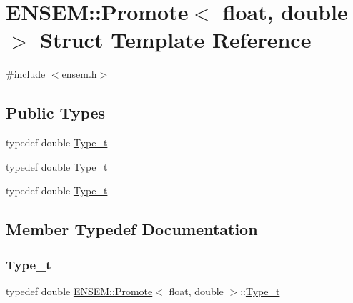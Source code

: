 \hypertarget{structENSEM_1_1Promote_3_01float_00_01double_01_4}{}\section{E\+N\+S\+EM\+:\+:Promote$<$ float, double $>$ Struct Template Reference}
\label{structENSEM_1_1Promote_3_01float_00_01double_01_4}


{\ttfamily \#include $<$ensem.\+h$>$}

\subsection*{Public Types}
\begin{DoxyCompactItemize}
\item 
typedef double \mbox{\hyperlink{structENSEM_1_1Promote_3_01float_00_01double_01_4_a09b7701594759488b49b335572cbfb62}{Type\+\_\+t}}
\item 
typedef double \mbox{\hyperlink{structENSEM_1_1Promote_3_01float_00_01double_01_4_a09b7701594759488b49b335572cbfb62}{Type\+\_\+t}}
\item 
typedef double \mbox{\hyperlink{structENSEM_1_1Promote_3_01float_00_01double_01_4_a09b7701594759488b49b335572cbfb62}{Type\+\_\+t}}
\end{DoxyCompactItemize}


\subsection{Member Typedef Documentation}
\mbox{\label{structENSEM_1_1Promote_3_01float_00_01double_01_4_a09b7701594759488b49b335572cbfb62}} 
\subsubsection{\texorpdfstring{Type\_t}{Type\_t}\hspace{0.1cm}{\footnotesize\ttfamily [1/3]}}
{\footnotesize\ttfamily typedef double \mbox{\hyperlink{structENSEM_1_1Promote}{E\+N\+S\+E\+M\+::\+Promote}}$<$ float, double $>$\+::\mbox{\hyperlink{structENSEM_1_1Promote_3_01float_00_01double_01_4_a09b7701594759488b49b335572cbfb62}{Type\+\_\+t}}}

